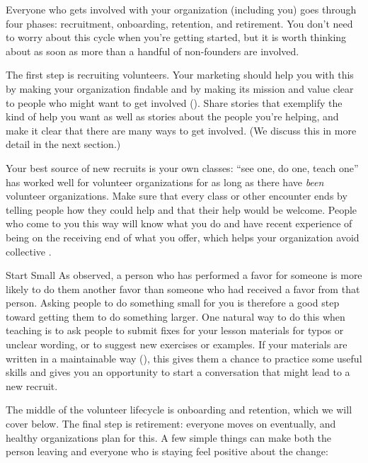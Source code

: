 
Everyone who gets involved with your organization
(including you)
goes through four phases:
recruitment, onboarding, retention, and retirement.
You don't need to worry about this cycle when you're getting started,
but it is worth thinking about
as soon as more than a handful of non-founders are involved.

The first step is recruiting volunteers.
Your marketing should help you with this by making your organization findable
and by making its mission and value clear
to people who might want to get involved
().
Share stories that exemplify the kind of help you want
as well as stories about the people you're helping,
and make it clear that there are many ways to get involved.
(We discuss this in more detail in the next section.)

Your best source of new recruits is your own classes:
``see one, do one, teach one'' has worked well for volunteer organizations
for as long as there have \emph{been} volunteer organizations.
Make sure that every class or other encounter
ends by telling people how they could help and that their help would be welcome.
People who come to you this way will know what you do
and have recent experience of being on the receiving end of what you offer,
which helps your organization avoid collective .

\begin{aside}{Start Small}
  As  observed,
  a person who has performed a favor for someone
  is more likely to do them another favor
  than someone who had received a favor from that person.
  Asking people to do something small for you
  is therefore a good step toward getting them to do something larger.
  One natural way to do this when teaching
  is to ask people to submit fixes for your lesson materials for typos or unclear wording,
  or to suggest new exercises or examples.
  If your materials are written in a maintainable way (),
  this gives them a chance to practice some useful skills
  and gives you an opportunity to start a conversation
  that might lead to a new recruit.
\end{aside}

The middle of the volunteer lifecycle is onboarding and retention,
which we will cover below.
The final step is retirement:
everyone moves on eventually,
and healthy organizations plan for this.
A few simple things can make both the person leaving and everyone who is staying
feel positive about the change:

